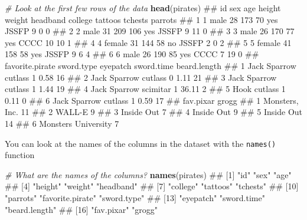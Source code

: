 \documentclass[]{book}
\newenvironment{Shaded}{\begin{snugshade}}{\end{snugshade}}
\newcommand{\KeywordTok}[1]{\textcolor[rgb]{0.13,0.29,0.53}{\textbf{{#1}}}}
\newcommand{\CommentTok}[1]{\textcolor[rgb]{0.56,0.35,0.01}{\textit{{#1}}}}
\newcommand{\NormalTok}[1]{{#1}}
\theoremstyle{definition}
\theoremstyle{definition}
\theoremstyle{remark}
\begin{document}
\begin{Shaded}
\begin{Highlighting}[]
\CommentTok{# Look at the first few rows of the data}
\KeywordTok{head}\NormalTok{(pirates)}
\NormalTok{##   id    sex age height weight headband college tattoos tchests parrots}
\NormalTok{## 1  1   male  28    173     70      yes   JSSFP       9       0       0}
\NormalTok{## 2  2   male  31    209    106      yes   JSSFP       9      11       0}
\NormalTok{## 3  3   male  26    170     77      yes    CCCC      10      10       1}
\NormalTok{## 4  4 female  31    144     58       no   JSSFP       2       0       2}
\NormalTok{## 5  5 female  41    158     58      yes   JSSFP       9       6       4}
\NormalTok{## 6  6   male  26    190     85      yes    CCCC       7      19       0}
\NormalTok{##   favorite.pirate sword.type eyepatch sword.time beard.length}
\NormalTok{## 1    Jack Sparrow    cutlass        1       0.58           16}
\NormalTok{## 2    Jack Sparrow    cutlass        0       1.11           21}
\NormalTok{## 3    Jack Sparrow    cutlass        1       1.44           19}
\NormalTok{## 4    Jack Sparrow   scimitar        1      36.11            2}
\NormalTok{## 5            Hook    cutlass        1       0.11            0}
\NormalTok{## 6    Jack Sparrow    cutlass        1       0.59           17}
\NormalTok{##             fav.pixar grogg}
\NormalTok{## 1      Monsters, Inc.    11}
\NormalTok{## 2              WALL-E     9}
\NormalTok{## 3          Inside Out     7}
\NormalTok{## 4          Inside Out     9}
\NormalTok{## 5          Inside Out    14}
\NormalTok{## 6 Monsters University     7}
\end{Highlighting}
\end{Shaded}

You can look at the names of the columns in the dataset with the
\texttt{names()} function

\begin{Shaded}
\begin{Highlighting}[]
\CommentTok{# What are the names of the columns?}
\KeywordTok{names}\NormalTok{(pirates)}
\NormalTok{##  [1] "id"              "sex"             "age"            }
\NormalTok{##  [4] "height"          "weight"          "headband"       }
\NormalTok{##  [7] "college"         "tattoos"         "tchests"        }
\NormalTok{## [10] "parrots"         "favorite.pirate" "sword.type"     }
\NormalTok{## [13] "eyepatch"        "sword.time"      "beard.length"   }
\NormalTok{## [16] "fav.pixar"       "grogg"}
\end{Highlighting}
\end{Shaded}
\end{document}
